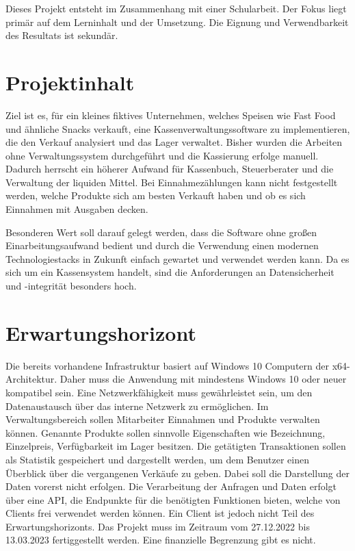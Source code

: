 Dieses Projekt entsteht im Zusammenhang mit einer Schularbeit. Der Fokus liegt primär auf dem Lerninhalt und der Umsetzung. Die Eignung und Verwendbarkeit des Resultats ist sekundär.

\section{Projektinhalt}
Ziel ist es, für ein kleines fiktives Unternehmen, welches Speisen wie Fast Food und ähnliche Snacks verkauft, eine Kassenverwaltungssoftware zu implementieren, die den Verkauf analysiert und das Lager verwaltet.
Bisher wurden die Arbeiten ohne Verwaltungssystem durchgeführt und die Kassierung erfolge manuell.
Dadurch herrscht ein höherer Aufwand für Kassenbuch, Steuerberater und die Verwaltung der liquiden Mittel.
Bei Einnahmezählungen kann nicht festgestellt werden, welche Produkte sich am besten Verkauft haben und ob es sich Einnahmen mit Ausgaben decken.

Besonderen Wert soll darauf gelegt werden, dass die Software ohne großen Einarbeitungsaufwand bedient und durch die Verwendung einen modernen Technologiestacks in Zukunft einfach gewartet und verwendet werden kann.
Da es sich um ein Kassensystem handelt, sind die Anforderungen an Datensicherheit und -integrität besonders hoch.

\section{Erwartungshorizont}
Die bereits vorhandene Infrastruktur basiert auf Windows 10 Computern der x64-Architektur.
Daher muss die Anwendung mit mindestens Windows 10 oder neuer kompatibel sein.
Eine Netzwerkfähigkeit muss gewährleistet sein, um den Datenaustausch über das interne Netzwerk zu ermöglichen.
Im Verwaltungsbereich sollen Mitarbeiter Einnahmen und Produkte verwalten können.
Genannte Produkte sollen sinnvolle Eigenschaften wie Bezeichnung, Einzelpreis, Verfügbarkeit im Lager besitzen.
Die getätigten Transaktionen sollen als Statistik gespeichert und dargestellt werden, um dem Benutzer einen Überblick über die vergangenen Verkäufe zu geben.
Dabei soll die Darstellung der Daten vorerst nicht erfolgen.
Die Verarbeitung der Anfragen und Daten erfolgt über eine API, die Endpunkte für die benötigten Funktionen bieten, welche von Clients frei verwendet werden können.
Ein Client ist jedoch nicht Teil des Erwartungshorizonts.
Das Projekt muss im Zeitraum vom 27.12.2022 bis 13.03.2023 fertiggestellt werden.
Eine finanzielle Begrenzung gibt es nicht.